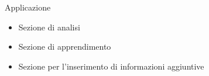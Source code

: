 \begin{tframe}{Applicazione}

    \begin{minipage}{0.30\textwidth}
        
        \begin{itemize}
            \item Sezione di analisi
            \item Sezione di apprendimento
            \item Sezione per l'inserimento di informazioni aggiuntive
        \end{itemize}
          
    \end{minipage}%
    \hfill
    \begin{minipage}{0.65\textwidth}
        

\end{minipage}
\end{tframe}
